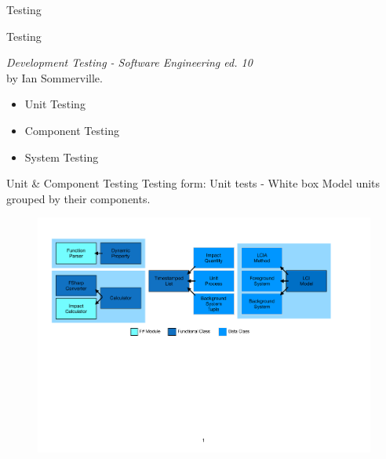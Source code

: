 \begin{frame}
\centering
\Large
Testing
\end{frame}
\begin{frame}{Testing}

\emph{Development Testing - Software Engineering ed. 10} \\
\hspace{5mm} by Ian Sommerville.

\vspace{5mm}

\begin{itemize}
    \item Unit Testing
    \item Component Testing
    \item System Testing
\end{itemize}
\end{frame}

\begin{frame}{Unit \& Component Testing}
    \vfill 
    Testing form: Unit tests - White box
    \vfill
    Model units grouped by their components.
    
    \begin{figure}
        \centering
        \includegraphics[width=\linewidth]{.figures/TestingGroups.pdf}
    \end{figure}
\end{frame}


